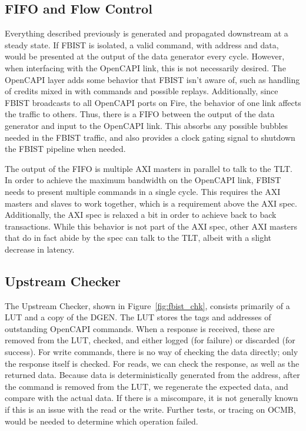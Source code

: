 \subsection{FIFO and Flow Control}
Everything described previously is generated and propagated downstream
at a steady state. If FBIST is isolated, a valid command, with address
and data, would be presented at the output of the data generator every
cycle. However, when interfacing with the OpenCAPI link, this is not
necessarily desired. The OpenCAPI layer adds some behavior that FBIST
isn't aware of, such as handling of credits mixed in with commands and
possible replays. Additionally, since FBIST broadcasts to all OpenCAPI
ports on Fire, the behavior of one link affects the traffic to
others. Thus, there is a FIFO between the output of the data generator
and input to the OpenCAPI link. This absorbs any possible bubbles
needed in the FBIST traffic, and also provides a clock gating signal
to shutdown the FBIST pipeline when needed.

The output of the FIFO is multiple AXI masters in parallel to talk to
the TLT. In order to achieve the maximum bandwidth on the OpenCAPI
link, FBIST needs to present multiple commands in a single cycle. This
requires the AXI masters and slaves to work together, which is a
requirement above the AXI spec. Additionally, the AXI spec is relaxed
a bit in order to achieve back to back transactions. While this
behavior is not part of the AXI spec, other AXI masters that do in
fact abide by the spec can talk to the TLT, albeit with a slight
decrease in latency.

\subsection{Upstream Checker}
The Upstream Checker, shown in Figure~\ref{fig:fbist_chk}, consists
primarily of a LUT and a copy of the DGEN. The LUT stores the tags and
addresses of outstanding OpenCAPI commands. When a response is
received, these are removed from the LUT, checked, and either logged
(for failure) or discarded (for success). For write commands, there is
no way of checking the data directly; only the response itself is
checked. For reads, we can check the response, as well as the returned
data. Because data is deterministically generated from the address,
after the command is removed from the LUT, we regenerate the expected
data, and compare with the actual data. If there is a miscompare, it
is not generally known if this is an issue with the read or the
write. Further tests, or tracing on OCMB, would be needed to determine
which operation failed.

